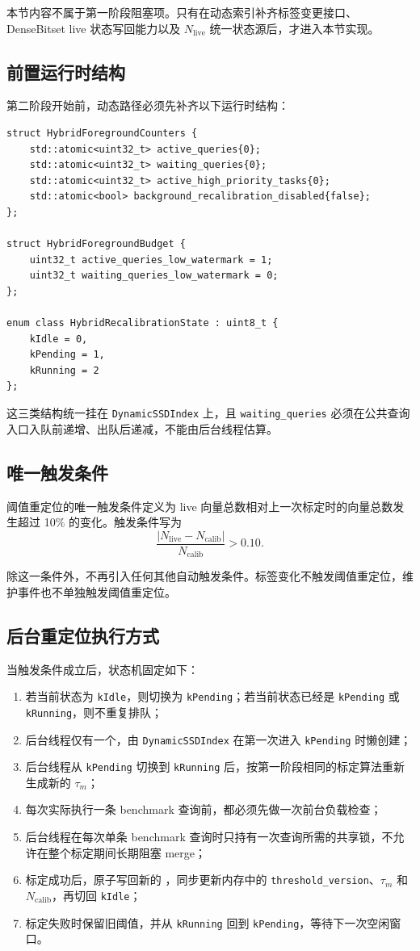 \documentclass[UTF8]{ctexart}
\begin{document}
本节内容不属于第一阶段阻塞项。只有在动态索引补齐标签变更接口、DenseBitset live 状态写回能力以及 \(N_{\text{live}}\) 统一状态源后，才进入本节实现。

\subsection{前置运行时结构}
第二阶段开始前，动态路径必须先补齐以下运行时结构：

\begin{verbatim}
struct HybridForegroundCounters {
	std::atomic<uint32_t> active_queries{0};
	std::atomic<uint32_t> waiting_queries{0};
	std::atomic<uint32_t> active_high_priority_tasks{0};
	std::atomic<bool> background_recalibration_disabled{false};
};

struct HybridForegroundBudget {
	uint32_t active_queries_low_watermark = 1;
	uint32_t waiting_queries_low_watermark = 0;
};

enum class HybridRecalibrationState : uint8_t {
	kIdle = 0,
	kPending = 1,
	kRunning = 2
};
\end{verbatim}

这三类结构统一挂在 \texttt{DynamicSSDIndex} 上，且 \texttt{waiting\_queries} 必须在公共查询入口入队前递增、出队后递减，不能由后台线程估算。

\subsection{唯一触发条件}
阈值重定位的唯一触发条件定义为 live 向量总数相对上一次标定时的向量总数发生超过 10\% 的变化。触发条件写为
\[
\frac{\left|N_{\text{live}}-N_{\text{calib}}\right|}{N_{\text{calib}}} > 0.10.
\]

除这一条件外，不再引入任何其他自动触发条件。标签变化不触发阈值重定位，维护事件也不单独触发阈值重定位。

\subsection{后台重定位执行方式}
当触发条件成立后，状态机固定如下：

\begin{enumerate}
\item 若当前状态为 \texttt{kIdle}，则切换为 \texttt{kPending}；若当前状态已经是 \texttt{kPending} 或 \texttt{kRunning}，则不重复排队；
\item 后台线程仅有一个，由 \texttt{DynamicSSDIndex} 在第一次进入 \texttt{kPending} 时懒创建；
\item 后台线程从 \texttt{kPending} 切换到 \texttt{kRunning} 后，按第一阶段相同的标定算法重新生成新的 \(\tau_m\)；
\item 每次实际执行一条 benchmark 查询前，都必须先做一次前台负载检查；
\item 后台线程在每次单条 benchmark 查询时只持有一次查询所需的共享锁，不允许在整个标定期间长期阻塞 merge；
\item 标定成功后，原子写回新的 ，同步更新内存中的 \texttt{threshold\_version}、\(\tau_m\) 和 \(N_{\text{calib}}\)，再切回 \texttt{kIdle}；
\item 标定失败时保留旧阈值，并从 \texttt{kRunning} 回到 \texttt{kPending}，等待下一次空闲窗口。
\end{enumerate}
\end{document}
